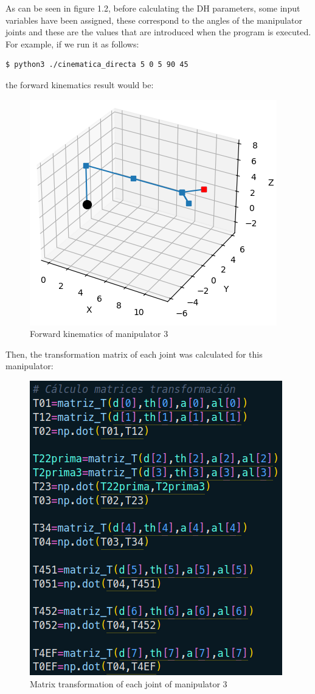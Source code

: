 \documentclass[11pt]{report}
\begin{document}
As can be seen in figure 1.2, before calculating the DH parameters, some input variables have been assigned, these 
correspond to the angles of the manipulator joints and these are the values that are introduced when the program is 
executed. For example, if we run it as follows:
\begin{verbatim}
$ python3 ./cinematica_directa 5 0 5 90 45
\end{verbatim}

the forward kinematics result would be:
\begin{figure}[H]
  \centering
  \includegraphics[scale=0.7]{img/cinematica_directa.png}
  \caption{Forward kinematics of manipulator 3}
\end{figure}

\newpage

Then, the transformation matrix of each joint was calculated for this manipulator:
\begin{figure}[H]
  \centering
  \includegraphics[scale=0.5]{img/matriz_transformacion.png}
  \caption{Matrix transformation of each joint of manipulator 3}
\end{figure}
\end{document}
